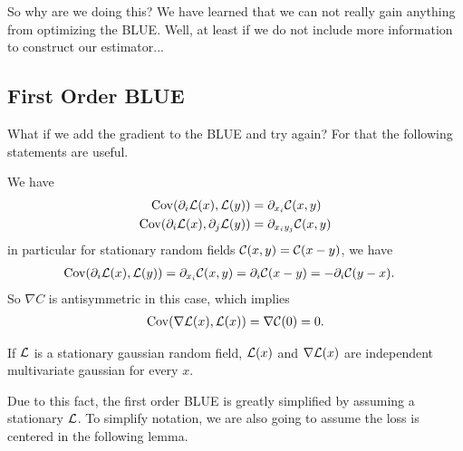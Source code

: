So why are we doing this? We have learned that we can not really gain
anything from optimizing the BLUE. Well, at least if we do not include more
information to construct our estimator...

\subsection{First Order BLUE}

What if we add the gradient to the BLUE and try again?
For that the following
statements are useful.
\begin{lemma}
	We have
	\begin{align*}
		\operatorname{Cov}(\partial_i\mathcal{L}(x), \mathcal{L}(y)) &= \partial_{x_i} \mathcal{C}(x,y)\\
		\operatorname{Cov}(\partial_i\mathcal{L}(x), \partial_j \mathcal{L}(y)) &= \partial_{x_i y_j} \mathcal{C}(x,y)
	\end{align*}
	in particular for stationary random fields \(\mathcal{C}(x,y)=\mathcal{C}(x-y)\), we have 
	\begin{align*}
		\operatorname{Cov}(\partial_i\mathcal{L}(x), \mathcal{L}(y)) &= \partial_{x_i} \mathcal{C}(x,y) = \partial_i \mathcal{C}(x-y) = - \partial_i \mathcal{C}(y-x).
	\end{align*}
	So \(\nabla C\) is antisymmetric in this case, which implies 
	\begin{align*}
		\operatorname{Cov}(\nabla\mathcal{L}(x), \mathcal{L}(x)) = \nabla \mathcal{C}(0)=0.
	\end{align*}
\end{lemma}

\begin{corollary}
	If \(\mathcal{L}\) is a stationary gaussian random field, \(\mathcal{L}(x)\) and
	\(\nabla\mathcal{L}(x)\) are independent multivariate gaussian for every \(x\).
\end{corollary}

Due to this fact, the first order BLUE is greatly simplified by assuming a
stationary \(\mathcal{L}\). To simplify notation, we are also going to assume
the loss is centered in the following lemma.

